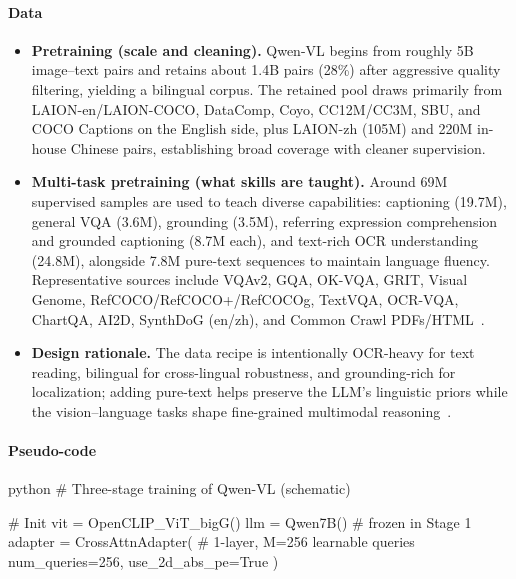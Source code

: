 \begin{enrichment}
\begin{enrichment}
        \paragraph{Data}
        \begin{itemize}
            \item \textbf{Pretraining (scale and cleaning).} Qwen\mbox{-}VL begins from roughly 5B image–text pairs and retains about 1.4B pairs (28\%) after aggressive quality filtering, yielding a bilingual corpus. The retained pool draws primarily from LAION\mbox{-}en/LAION\mbox{-}COCO, DataComp, Coyo, CC12M/CC3M, SBU, and COCO Captions on the English side, plus LAION\mbox{-}zh (105M) and 220M in\mbox{-}house Chinese pairs, establishing broad coverage with cleaner supervision.
            \item \textbf{Multi\mbox{-}task pretraining (what skills are taught).} Around 69M supervised samples are used to teach diverse capabilities: captioning (19.7M), general VQA (3.6M), grounding (3.5M), referring expression comprehension and grounded captioning (8.7M each), and text\mbox{-}rich OCR understanding (24.8M), alongside 7.8M pure\mbox{-}text sequences to maintain language fluency. Representative sources include VQAv2, GQA, OK\mbox{-}VQA, GRIT, Visual Genome, RefCOCO/RefCOCO+/RefCOCOg, TextVQA, OCR\mbox{-}VQA, ChartQA, AI2D, SynthDoG (en/zh), and Common Crawl PDFs/HTML~\cite[Table~3]{bai2023_qwenvl}.
            \item \textbf{Design rationale.} The data recipe is intentionally OCR\mbox{-}heavy for text reading, bilingual for cross\mbox{-}lingual robustness, and grounding\mbox{-}rich for localization; adding pure\mbox{-}text helps preserve the LLM’s linguistic priors while the vision\mbox{--}language tasks shape fine\mbox{-}grained multimodal reasoning~\cite[Sec.~3; Tables~2--3]{bai2023_qwenvl}.
        \end{itemize}
        
        \paragraph{Pseudo\mbox{-}code}
        \begin{mintedbox}{python}
            # Three-stage training of Qwen-VL (schematic)
            
            # Init
            vit = OpenCLIP_ViT_bigG()
            llm = Qwen7B()                 # frozen in Stage 1
            adapter = CrossAttnAdapter(    # 1-layer, M=256 learnable queries
            num_queries=256, use_2d_abs_pe=True
            )
            

\end{mintedbox}
\end{enrichment}
\end{enrichment}
